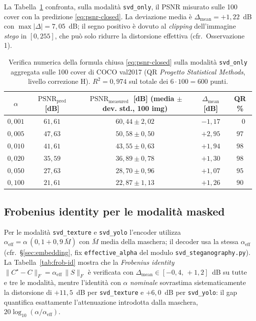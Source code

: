 \documentclass[11pt,a4paper]{article}
\theoremstyle{definition}
\theoremstyle{remark}
\DeclareMathOperator{\PSNR}{PSNR}
\begin{document}
La Tabella~\ref{tab:theory} confronta, sulla modalit\`a \verb|svd_only|,
il PSNR misurato sulle 100 cover con la predizione \eqref{eq:psnr-closed}.
La deviazione media \`e $\Delta_{\text{mean}} = +1{,}22$~dB con
$\max|\Delta| = 7{,}05$~dB; il segno positivo \`e dovuto al
\emph{clipping} dell'immagine \emph{stego} in $[0,255]$, che pu\`o
solo ridurre la distorsione effettiva (cfr.\ Osservazione 1).

\begin{table}[H]\centering
\begin{tabular}{ccccc}
\toprule
$\alpha$ & $\PSNR_{\text{pred}}$ [dB] & $\PSNR_{\text{measured}}$ [dB] (media $\pm$ dev. std., 100 img) & $\Delta_{\text{mean}}$ [dB] & QR \% \\
\midrule
$0{,}001$ & $61{,}61$ & $60{,}44 \pm 2{,}02$ & $-1{,}17$ & $\phantom{00}0$ \\
$0{,}005$ & $47{,}63$ & $50{,}58 \pm 0{,}50$ & $+2{,}95$ & $97$ \\
$0{,}010$ & $41{,}61$ & $43{,}55 \pm 0{,}63$ & $+1{,}94$ & $98$ \\
$0{,}020$ & $35{,}59$ & $36{,}89 \pm 0{,}78$ & $+1{,}30$ & $98$ \\
$0{,}050$ & $27{,}63$ & $28{,}70 \pm 0{,}96$ & $+1{,}07$ & $95$ \\
$0{,}100$ & $21{,}61$ & $22{,}87 \pm 1{,}13$ & $+1{,}26$ & $90$ \\
\bottomrule
\end{tabular}
\caption{\label{tab:theory}Verifica numerica della formula chiusa
\eqref{eq:psnr-closed} sulla modalit\`a \texttt{svd\_only} aggregata
sulle 100 cover di COCO val2017 (QR \emph{Progetto Statistical Methods},
livello correzione H).  $R^{2} = 0{,}974$ sul totale dei $6\cdot 100 = 600$ punti.}
\end{table}

\subsection{Frobenius identity per le modalit\`a masked}
\label{sec:frob-id-empirical}

Per le modalit\`a \verb|svd_texture| e \verb|svd_yolo| l'encoder
utilizza $\alpha_{\text{eff}} = \alpha\,(0{,}1 + 0{,}9\,\bar M)$ con
$\bar M$ media della maschera; il decoder usa la stessa
$\alpha_{\text{eff}}$ (cfr.\ \S\ref{sec:embedding}, fix
\verb|effective_alpha| del modulo \verb|svd_steganography.py|).
La Tabella~\ref{tab:frob-id} mostra che la \emph{Frobenius identity}
$\|C^{\star} - C\|_F = \alpha_{\text{eff}}\,\|S\|_F$ \`e verificata
con $\Delta_{\text{mean}} \in [-0{,}4,\,+1{,}2]$~dB su tutte e tre le
modalit\`a, mentre l'identit\`a con $\alpha$ \emph{nominale}
sovrastima sistematicamente la distorsione di
$+11{,}5$~dB per \verb|svd_texture| e $+6{,}0$~dB per \verb|svd_yolo|:
il gap quantifica esattamente l'attenuazione introdotta dalla
maschera, $20\log_{10}(\alpha/\alpha_{\text{eff}})$.
\end{document}
